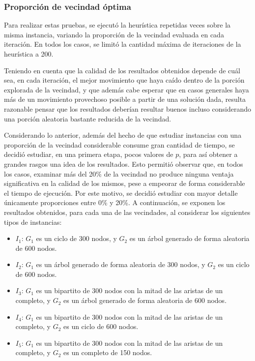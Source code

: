 \subsubsection{Proporción de vecindad óptima}
Para realizar estas pruebas, se ejecutó la heurística repetidas veces sobre
la misma instancia, variando la proporción de la vecindad evaluada en cada
iteración. En todos los casos, se limitó la cantidad máxima de iteraciones
de la heurística a 200.

Teniendo en cuenta que la calidad de los resultados obtenidos depende de cuál
sea, en cada iteración, el mejor movimiento que haya caído dentro de la
porción explorada de la vecindad, y que además cabe esperar que en casos
generales haya más de un movimiento provechoso posible a partir de una
solución dada, resulta razonable pensar que los resultados deberían resultar
buenos incluso considerando una porción aleatoria bastante reducida de la
vecindad.

Considerando lo anterior, además del hecho de que estudiar instancias con una
proporción de la vecindad considerable consume gran cantidad de tiempo, se
decidió estudiar, en una primera etapa, pocos valores de $p$, para así obtener
a grandes rasgos una idea de los resultados. Esto permitió observar que, en
todos los casos, examinar más del 20\% de la vecindad no produce ninguna
ventaja significativa en la calidad de los mismos, pese a empeorar de forma
considerable el tiempo de ejecución. Por este motivo, se decidió estudiar con
mayor detalle únicamente proporciones entre 0\% y 20\%. A continuación, se
exponen los resultados obtenidos, para cada una de las vecindades, al
considerar los siguientes tipos de instancias:

\begin{itemize}
    \item $I_1$: $G_1$ es un ciclo de 300 nodos, y $G_2$ es un árbol generado
    de forma aleatoria de 600 nodos.
    \item $I_2$: $G_1$ es un árbol generado de forma aleatoria de 300 nodos, y
    $G_2$ es un ciclo de 600 nodos.
    \item $I_3$: $G_1$ es un bipartito de 300 nodos con la mitad de las
    aristas de un completo, y $G_2$ es un árbol generado de forma aleatoria de
    600 nodos.
    \item $I_4$: $G_1$ es un bipartito de 300 nodos con la mitad de las
    aristas de un completo, y $G_2$ es un ciclo de 600 nodos.
    \item $I_5$: $G_1$ es un bipartito de 300 nodos con la mitad de las
    aristas de un completo, y $G_2$ es un completo de 150 nodos.
\end{itemize}

